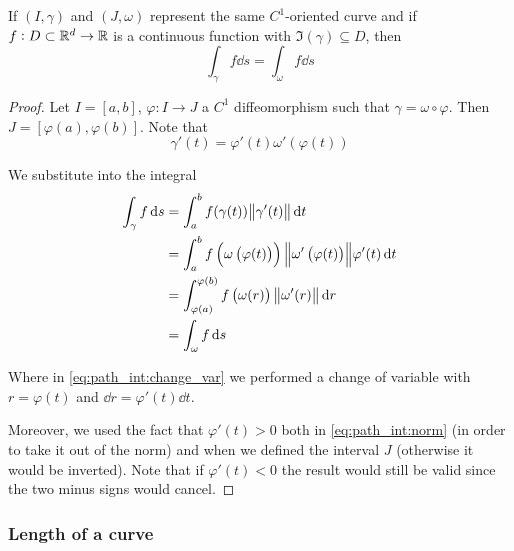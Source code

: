 \documentclass[14pt]{extarticle}
\begin{document}
\begin{proposition}
    If $(I, \gamma)$ and $(J, \omega)$ represent the same $C^1$-oriented curve and if $f: D \subset \mathbb{R}^d \to \mathbb{R}$  is a continuous function with $\Im(\gamma) \subseteq D$, then
    \begin{equation}
        \int_\gamma f \dd{s} = \int_\omega f \dd{s}
    \end{equation}
\end{proposition}

\begin{proof}
    Let $I = [a, b]$, $\varphi: I \to J$ a $C^1$ diffeomorphism such that $\gamma = \omega \circ \varphi$. Then $J = [\varphi(a), \varphi(b)]$.
    Note that
    \begin{equation}
        \gamma'(t) = \varphi'(t)\omega'(\varphi(t))
    \end{equation}

    We substitute into the integral
    \begin{align}
        \int_\gamma f \dd{s} & = \int_a^b f(\gamma (t)) \norm{\gamma'(t)} \dd{t}                                                                                        \\
                             & =\int_a^b f\left(\omega\left(\varphi (t)\right)\right) \norm{\omega'\left(\varphi(t)\right)} \varphi'(t) \dd{t} \label{eq:path_int:norm} \\
                             & = \int_{\varphi(a)}^{\varphi(b)} f\left(\omega (r)\right) \norm{\omega'(r)} \dd{r} \label{eq:path_int:change_var}                        \\
                             & = \int_\omega f \dd{s}
    \end{align}

    Where in \autoref{eq:path_int:change_var} we performed a change of variable with $r = \varphi(t)$ and $\dd{r} = \varphi'(t) \dd{t}$.

    Moreover, we used the fact that $\varphi'(t) > 0$ both in \autoref{eq:path_int:norm} (in order to take it out of the norm) and when we defined the interval $J$ (otherwise it would be inverted).
    Note that if $\varphi'(t) < 0$ the result would still be valid since the two minus signs would cancel.
\end{proof}

\subsubsection{Length of a curve}
\end{document}
